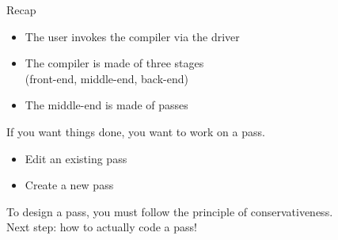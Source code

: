 \begin{frame}{Recap}
\begin{itemize}
\item The \alert{user} invokes the \alert{compiler} via the \alert{driver}
\item The \alert{compiler} is made of three \alert{stages}\\(front-end, middle-end, back-end)
\item The \alert{middle-end} is made of \alert{passes}
\end{itemize}
\medskip
If you want things done, you want to work on a \alert{pass}.\\
\medskip
\begin{itemize}
\item Edit an existing pass
\item Create a new pass
\end{itemize}
\medskip
To design a pass, you must follow the principle of \alert{conservativeness}.\\
\bigskip\centering\large
Next step: how to actually code a pass!
\end{frame}






